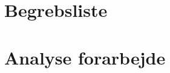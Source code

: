 
\usepackage[utf8]{inputenc}
\usepackage[table,xcdraw]{xcolor}
\usepackage{float}
\usepackage{graphicx}
\usepackage{placeins}
\TabPositions{4cm, 6cm, 8cm}


\frontmatter
\newpage
\listoftodos[Notes]

\chapter{Begrebsliste}
\cleardoublepage
\tableofcontents*
\mainmatter
\chapter{Analyse forarbejde}



